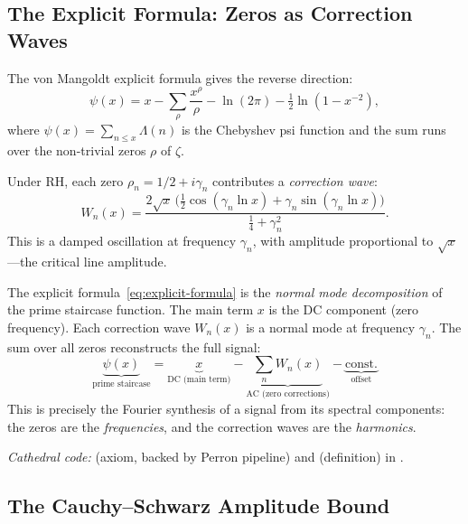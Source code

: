 \subsection{The Explicit Formula: Zeros as Correction Waves}

The von Mangoldt explicit formula gives the reverse direction:
\begin{equation}
  \psi(x) = x - \sum_\rho \frac{x^\rho}{\rho}
  - \ln(2\pi) - \tfrac{1}{2}\ln(1 - x^{-2}),
  \label{eq:explicit-formula}
\end{equation}
where $\psi(x) = \sum_{n \leq x} \Lambda(n)$ is the Chebyshev psi function
and the sum runs over the non-trivial zeros $\rho$ of $\zeta$.

Under RH, each zero $\rho_n = 1/2 + i\gamma_n$ contributes a
\emph{correction wave}:
\begin{equation}
  W_n(x) = \frac{2\sqrt{x}\,
  \bigl(\tfrac{1}{2}\cos(\gamma_n \ln x)
  + \gamma_n \sin(\gamma_n \ln x)\bigr)}
  {\tfrac{1}{4} + \gamma_n^2}.
  \label{eq:zero-contribution}
\end{equation}
This is a damped oscillation at frequency $\gamma_n$, with amplitude
proportional to $\sqrt{x}$---the critical line amplitude.

\begin{correspondence}
\label{corr:normal-modes}
The explicit formula~\eqref{eq:explicit-formula} is the
\emph{normal mode decomposition} of the prime staircase function.
The main term $x$ is the DC component (zero frequency). Each
correction wave $W_n(x)$ is a normal mode at frequency $\gamma_n$.
The sum over all zeros reconstructs the full signal:
\[
  \underbrace{\psi(x)}_{\text{prime staircase}}
  = \underbrace{x}_{\text{DC (main term)}}
  - \underbrace{\sum_n W_n(x)}_{\text{AC (zero corrections)}}
  - \underbrace{\text{const.}}_{\text{offset}}
\]
This is precisely the Fourier synthesis of a signal from its
spectral components: the zeros are the \emph{frequencies}, and
the correction waves are the \emph{harmonics}.

\emph{Cathedral code:} 
(axiom, backed by Perron pipeline) and 
(definition) in .
\end{correspondence}

\subsection{The Cauchy--Schwarz Amplitude Bound}

